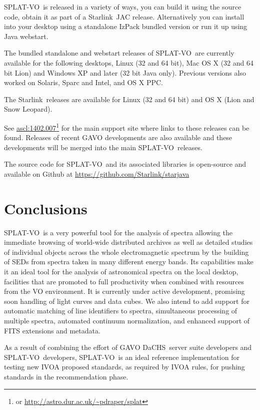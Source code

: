 \documentclass[final,authoryear,5p,times,twocolumn]{elsarticle}
\newcommand{\splatvo}{{\textsf{\small{SPLAT-VO}}}}
\newcommand{\dachs}{\textsf{\small DaCHS}}
\newcommand{\Starlink}{\textsf{\small Starlink}}
\newcommand{\ascl}[1]{\href{http://www.ascl.net/#1}{ascl:#1}}
\begin{document}
\splatvo\ is released in a variety of ways, you can build it using the source
code, obtain it as part of a \Starlink\ JAC release. Alternatively you can
install into your desktop using a standalone IzPack bundled version or run it
up using Java webstart.

The bundled standalone and webstart releases of \splatvo\ are currently
available for the following desktops, Linux (32 and 64 bit), Mac OS X (32 and
64 bit Lion) and Windows XP and later (32 bit Java only). Previous versions
also worked on Solaris, Sparc and Intel, and OS X PPC.

The \Starlink\ releases
\citep[e.g.,][]{currie_adassxxiii,2013ASPC..475..247B} are available
for Linux (32 and 64 bit) and OS X (Lion and Snow Leopard).

See \ascl{1402.007}\footnote{or \url{http://astro.dur.ac.uk/~pdraper/splat}}
for the main support site where links to these releases can be found.
Releases of recent GAVO developments are also available and these
developments will be merged into the main \splatvo\ releases.

The source code for \splatvo\ and its associated libraries is
open-source and available on Github at
\url{https://github.com/Starlink/starjava}


\section{Conclusions}

\splatvo\ is a very powerful tool for the analysis of spectra allowing the
immediate browsing of world-wide distributed archives as well as detailed
studies of individual objects across the whole electromagnetic spectrum by the
building of SEDs from spectra taken in many different energy bands. Its
capabilities make it an ideal tool for the analysis of astronomical spectra on
the local desktop, facilities that are promoted to full productivity when
combined with resources from the VO environment. It is currently under active
development, promising soon handling of light curves and data cubes. We
also intend to add support for automatic matching of line identifiers to
spectra, simultaneous processing of multiple spectra, automated continuum
normalization, and enhanced support of FITS extensions and metadata.

As a result of combining the effort of GAVO \dachs\ server suite
developers and \splatvo\ developers, \splatvo\ is an ideal reference
implementation for testing new IVOA proposed standards, as required by
IVOA rules, for pushing standards in the recommendation phase.
\end{document}
